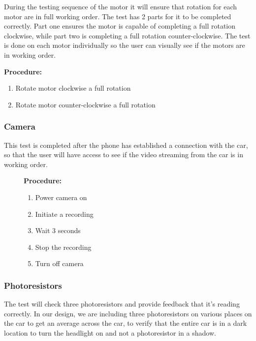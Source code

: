 \documentclass[letterpaper,12pt]{report}
\begin{document}
    During the testing sequence of the motor it will ensure that rotation for
    each motor are in full working order. The test has 2 parts for it to be
    completed correctly. Part one ensures the motor is capable of completing a
    full rotation clockwise, while part two is completing a full rotation
    counter-clockwise. The test is done on each motor individually so the user
    can visually see if the motors are in working order.

    \textbf{Procedure:}
    \begin{enumerate}
        \item Rotate motor clockwise a full rotation
        \item Rotate motor counter-clockwise a full rotation
    \end{enumerate}

    \subsubsection{Camera}

    This test is completed after the phone has established a connection with the
    car, so that the user will have access to see if the video streaming from
    the car is in working order.

    \begin{figure}
        \textbf{Procedure:}
        \begin{enumerate}
            \item Power camera on
            \item Initiate a recording
            \item Wait 3 seconds
            \item Stop the recording
            \item Turn off camera
        \end{enumerate}
    \end{figure}

    \subsubsection{Photoresistors}

    The test will check three photoresistors and provide feedback that it's
    reading correctly. In our design, we are including three photoresistors on
    various places on the car to get an average across the car, to verify that
    the entire car is in a dark location to turn the headlight on and not a
    photoresistor in a shadow.
\end{document}
